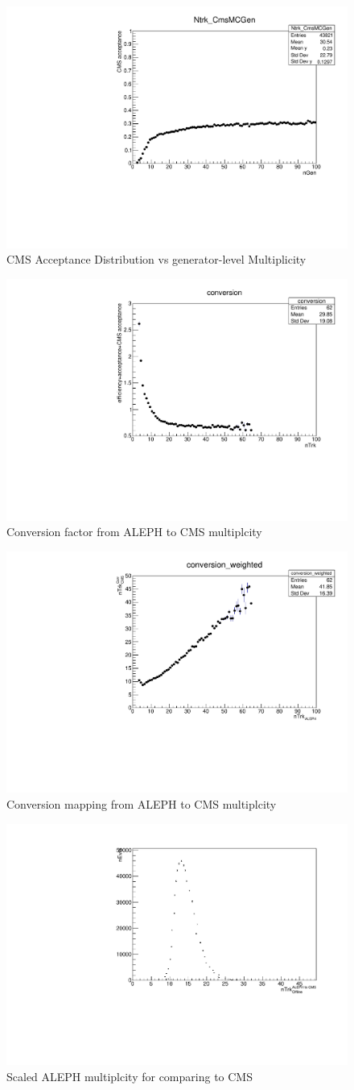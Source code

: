 \begin{figure}[!htb]
\begin{center}
\includegraphics[width=.45\textwidth]{images/MultiplicityConversion/nTrk_CMSMCGen.pdf}
\caption{CMS Acceptance Distribution vs generator-level Multiplicity}
\label{fig:CMSAcc} 
\end{center}
\end{figure}

\begin{figure}[!htb]
\begin{center}
\includegraphics[width=.45\textwidth]{images/MultiplicityConversion/conversion.pdf}
\caption{Conversion factor from ALEPH to CMS multiplcity}
\label{fig:conversion} 
\end{center}
\end{figure}

\begin{figure}[!htb]
\begin{center}
\includegraphics[width=.45\textwidth]{images/MultiplicityConversion/conversion_weighted.pdf}
\caption{Conversion mapping from ALEPH to CMS multiplcity}
\label{fig:conversion2} 
\end{center}
\end{figure}

\begin{figure}[!htb]
\begin{center}
\includegraphics[width=.45\textwidth]{images/MultiplicityConversion/new_nTrk_ALEPHConverted.pdf}
\caption{Scaled ALEPH multiplcity for comparing to CMS}
\label{fig:CMSComparison} 
\end{center}
\end{figure}